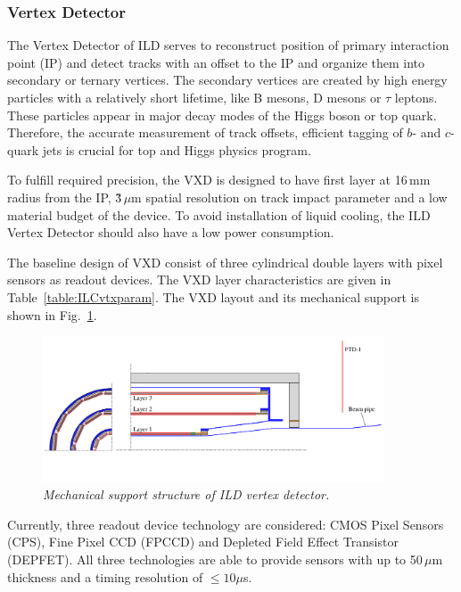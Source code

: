 \subsubsection{Vertex Detector}
The Vertex Detector of ILD serves to reconstruct position of primary interaction point (IP) and detect tracks with an offset to the IP and organize them into secondary or ternary vertices. The secondary vertices are created by high energy particles with a relatively short lifetime, like B mesons, D mesons or $\tau$ leptons. These particles appear in major decay modes of the Higgs boson or top quark. Therefore, the accurate measurement of track offsets, efficient tagging of $b$- and $c$-quark jets is crucial for top and Higgs physics program. %

To fulfill required precision, the VXD is designed to have first layer at 16\,mm radius from the IP, \~3\,$\mu$m spatial resolution on track impact parameter and a low material budget of the device. To avoid installation of liquid cooling, the ILD Vertex Detector should also have a low power consumption.

The baseline design of VXD consist of three cylindrical double layers with pixel sensors as readout devices. The VXD layer characteristics are given in Table~\ref{table:ILCvtxparam}.
The VXD layout and its mechanical support is shown in Fig.~\ref{fig:ILCvtxsupport}. 



\begin{figure}[H]
\centering

    \includegraphics[width=0.9\textwidth]{graphics/ILCvtxsupport.png}
    \caption{\sl Mechanical support structure of ILD vertex detector.}
    \label{fig:ILCvtxsupport}


\end{figure}

Currently, three readout device technology are considered: CMOS Pixel Sensors (CPS), Fine Pixel CCD (FPCCD) and Depleted Field Effect Transistor (DEPFET).
All three technologies are able to provide sensors with up to 50\,$\mu$m thickness and a timing resolution of $\leq 10\mu$s. 

